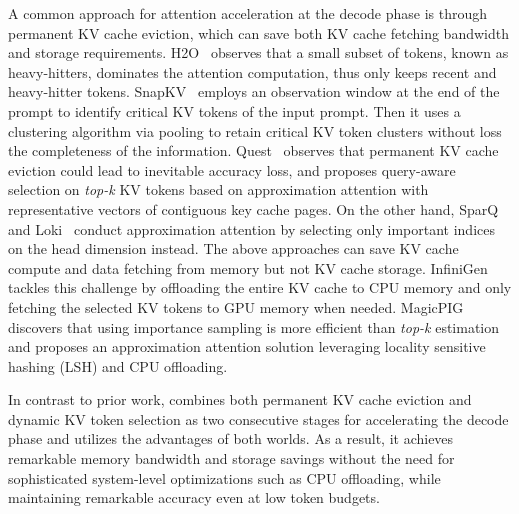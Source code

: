 A common approach for attention acceleration at the decode phase is through permanent KV cache eviction, which can save both KV cache fetching bandwidth and storage requirements. H2O~\cite{h2o2024} observes that a small subset of tokens, known as heavy-hitters, dominates the attention computation, thus only keeps recent and heavy-hitter tokens. SnapKV~\cite{snapkv2024} employs an observation window at the end of the prompt to identify critical KV tokens of the input prompt. Then it uses a clustering algorithm via pooling to retain critical KV token clusters without loss the completeness of the information.
Quest~\cite{quest2024} observes that permanent KV cache eviction could lead to inevitable accuracy loss, and proposes query-aware selection on \textit{top-k} KV tokens based on approximation attention with representative vectors of contiguous key cache pages. On the other hand, SparQ and Loki~\cite{sparq2024,loki2024} conduct approximation attention by selecting only important indices on the head dimension instead.
The above approaches can save KV cache compute and data fetching from memory but not KV cache storage. InfiniGen~\cite{ infinigen2024} tackles this challenge by offloading the entire KV cache to CPU memory and only fetching the selected KV tokens to GPU memory when needed. MagicPIG\cite{magicpig2024} discovers that using importance sampling is more efficient than \textit{top-k} estimation and proposes an approximation attention solution leveraging locality sensitive hashing (LSH) and CPU offloading.

In contrast to prior work, \rocketkv combines both permanent KV cache eviction and dynamic KV token selection as two consecutive stages for accelerating the decode phase and utilizes the advantages of both worlds. As a result, it achieves remarkable memory bandwidth and storage savings without the need for sophisticated system-level optimizations such as CPU offloading, while maintaining remarkable accuracy even at low token budgets.




